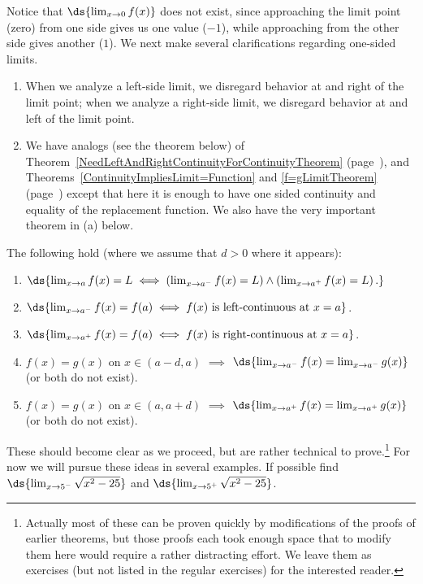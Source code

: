 Notice that $\ds{\lim_{x\to0}f(x)}$ does not exist, since 
approaching the limit point (zero) 
from one side gives us one value ($-1$), while
approaching from the other side gives another ($1$).
We next make several clarifications regarding one-sided
limits.
\begin{enumerate}
\item When we analyze a left-side limit, we disregard
      behavior at and right  of the limit point;
      when we analyze a right-side limit, we disregard
      behavior at and left of the limit point.
\item We have analogs (see the theorem below) of 
 Theorem~\ref{NeedLeftAndRightContinuityForContinuityTheorem}
(page~\pageref{NeedLeftAndRightContinuityForContinuityTheorem}),
and 
Theorems~\ref{ContinuityImpliesLimit=Function}
and \ref{f=gLimitTheorem} (page~\pageref{f=gLimitTheorem}) 
except that here it is enough to have
one sided continuity and equality of the replacement function.
We also have the very important theorem in (a) below.
\end{enumerate}
\begin{theorem}The following hold
(where we assume that $d>0$ where it appears):
\begin{enumerate}[\rm\bf(a)]
\item $\ds{\lim_{x\to a}f(x)=L \iff
      \left(\lim_{x\to a^-}f(x)=L\right)\wedge
      \left(\lim_{x\to a^+}f(x)=L\right).}$
\item $\ds{\lim_{x\to a^-}f(x)=f(a)\iff f(x)\text{ is
      left-continuous at }x=a}$.
\item $\ds{\lim_{x\to a^+}f(x)=f(a)\iff f(x)\text{ is
      right-continuous at }x=a}$.
\item $f(x)=g(x)$ on $x\in(a-d,a)$ $\implies$
      $\ds{\lim_{x\to a^-}f(x)=\lim_{x\to a^-}g(x)}$
      (or both do not exist).
\item $f(x)=g(x)$ on $x\in(a,a+d)$ $\implies$
      $\ds{\lim_{x\to a^+}f(x)=\lim_{x\to a^+}g(x)}$
      (or both do not exist).
\end{enumerate}\label{One-SideLimitTheorem}\end{theorem}
These should become  clear as we
proceed, but are rather technical to prove.\footnote{
Actually most of these can be proven quickly by 
modifications of the proofs of earlier theorems, but those
proofs each took enough space that to modify them
here would require a rather distracting effort.
We leave them as exercises (but not listed in the
regular exercises) for the interested reader.
}
For now we will pursue these ideas in several examples.
\bex If possible find $\ds{\lim_{x\to5^-}\sqrt{x^2-25}}$
and $\ds{\lim_{x\to5^+}\sqrt{x^2-25}}$.

